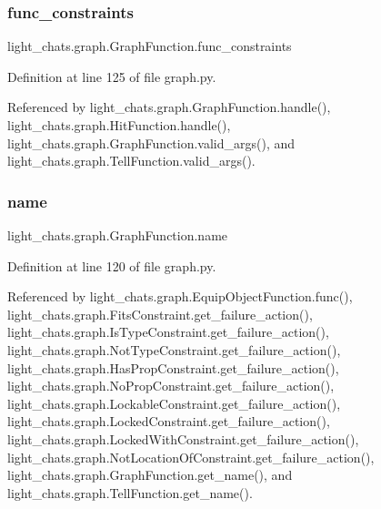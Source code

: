 \mbox{\label{classlight__chats_1_1graph_1_1GraphFunction_a46da34454c8776f43d4102c74a650334}} 
\subsubsection{\texorpdfstring{func\+\_\+constraints}{func\_constraints}}
{\footnotesize\ttfamily light\+\_\+chats.\+graph.\+Graph\+Function.\+func\+\_\+constraints}



Definition at line 125 of file graph.\+py.



Referenced by light\+\_\+chats.\+graph.\+Graph\+Function.\+handle(), light\+\_\+chats.\+graph.\+Hit\+Function.\+handle(), light\+\_\+chats.\+graph.\+Graph\+Function.\+valid\+\_\+args(), and light\+\_\+chats.\+graph.\+Tell\+Function.\+valid\+\_\+args().

\mbox{\label{classlight__chats_1_1graph_1_1GraphFunction_afb7e1d1d49ff540be034f685f4d1e337}} 
\subsubsection{\texorpdfstring{name}{name}}
{\footnotesize\ttfamily light\+\_\+chats.\+graph.\+Graph\+Function.\+name}



Definition at line 120 of file graph.\+py.



Referenced by light\+\_\+chats.\+graph.\+Equip\+Object\+Function.\+func(), light\+\_\+chats.\+graph.\+Fits\+Constraint.\+get\+\_\+failure\+\_\+action(), light\+\_\+chats.\+graph.\+Is\+Type\+Constraint.\+get\+\_\+failure\+\_\+action(), light\+\_\+chats.\+graph.\+Not\+Type\+Constraint.\+get\+\_\+failure\+\_\+action(), light\+\_\+chats.\+graph.\+Has\+Prop\+Constraint.\+get\+\_\+failure\+\_\+action(), light\+\_\+chats.\+graph.\+No\+Prop\+Constraint.\+get\+\_\+failure\+\_\+action(), light\+\_\+chats.\+graph.\+Lockable\+Constraint.\+get\+\_\+failure\+\_\+action(), light\+\_\+chats.\+graph.\+Locked\+Constraint.\+get\+\_\+failure\+\_\+action(), light\+\_\+chats.\+graph.\+Locked\+With\+Constraint.\+get\+\_\+failure\+\_\+action(), light\+\_\+chats.\+graph.\+Not\+Location\+Of\+Constraint.\+get\+\_\+failure\+\_\+action(), light\+\_\+chats.\+graph.\+Graph\+Function.\+get\+\_\+name(), and light\+\_\+chats.\+graph.\+Tell\+Function.\+get\+\_\+name().

